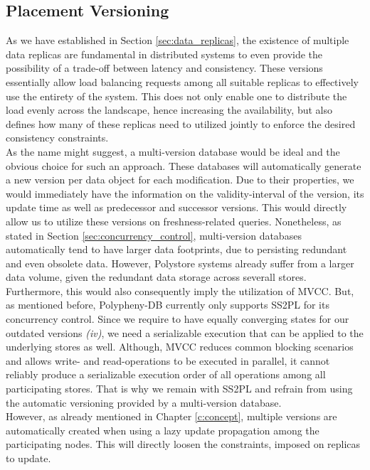 \subsection{Placement Versioning}

As we have established in Section \ref{sec:data_replicas}, the existence of multiple data replicas are fundamental in distributed systems to even provide the 
possibility of a trade-off between latency and consistency. These versions essentially allow load balancing requests among all suitable replicas to effectively 
use the entirety of the system. This does not only enable one to distribute the load evenly across the landscape, hence increasing the availability,
but also defines how many of these replicas need to utilized jointly to enforce the desired consistency constraints.\\
As the name might suggest, a multi-version database would be ideal and the obvious choice for such an approach.
These databases will automatically generate a new version per data object for each modification. 
Due to their properties, we would immediately have the information on the validity-interval of the version, its update time as well as predecessor and successor versions.
This would directly allow us to utilize these versions on freshness-related queries. 
Nonetheless, as stated in Section \ref{sec:concurrency_control}, multi-version databases automatically tend to have larger data footprints, due to persisting  
redundant and even obsolete data.
However, Polystore systems already suffer from a larger data volume, given the redundant data storage across severall stores.
Furthermore, this would also consequently imply the utilization of MVCC.
But, as mentioned before, Polypheny-DB currently only supports SS2PL for its concurrency control.
Since we require to have equally converging states for our outdated versions \textit{(iv)}, we need a serializable execution that can be applied to 
the underlying stores as well.
Although, MVCC reduces common blocking scenarios and allows write- and read-operations to be executed in parallel, 
it cannot reliably produce a serializable execution order of all operations among all participating stores.
That is why we remain with SS2PL and refrain from using the automatic versioning provided by a multi-version database.\\
However, as already mentioned in Chapter \ref{c:concept}, multiple versions are automatically created when using a lazy update propagation among the participating nodes. 
This will directly loosen the constraints, imposed on replicas to update. 
